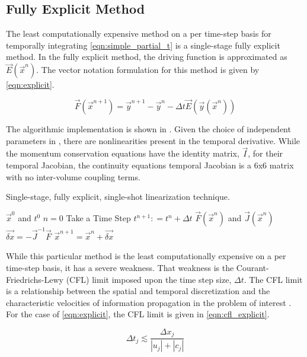 \subsection{Fully Explicit Method}
\label{subsect:numerics_explicit}
The least computationally expensive method on a per time-step basis for temporally integrating \eqref{eqn:simple_partial_t} is a single-stage fully explicit method.
In the fully explicit method, the driving function is approximated as $\vec{E}(\vec{x}^n)$.
The vector notation formulation for this method is given by \eqref{eqn:explicit}. 

\begin{equation}
\label{eqn:explicit}
\vec{F}(\vec{x}^{n+1}) = \vec{y}^{n+1} - \vec{y}^{n} - \Delta t \vec{E}(\vec{y}(\vec{x}^{n}))
\end{equation}

The algorithmic implementation is shown in .
Given the choice of independent parameters in \cobra{}, there are nonlinearities present in the temporal derivative.
While the momentum conservation equations have the identity matrix, $\vec{I}$, for their temporal Jacobian, the continuity equations temporal Jacobian is a 6x6 matrix with no inter-volume coupling terms.

\begin{algo}[H]
\caption{Single-stage, fully explicit, single-shot linearization technique.}
\label{algo:explicit}
\setlength{\baselineskip}{0.625\baselineskip}
\begin{algorithmic}[1]
\Require $\vec{x}^{0}$ and $t^{0}$
\Set $n = 0$
\Loop \; Take a Time Step
    \State $t^{n+1} : = t^{n} + \Delta t$
    \Calculate $\vec{F}(\vec{x}^n)$ and $\vec{J}(\vec{x}^n)$
    \Calculate $\vec{\delta x} = -\vec{J}^{-1}\vec{F}$
    \Calculate $\vec{x}^{n+1} = \vec{x}^{n} + \vec{\delta x}$ 
\end{algorithmic}
\end{algo}

While this particular method is the least computationally expensive on a per time-step basis, it has a severe weakness.
That weakness is the Courant-Friedrichs-Lewy (CFL) limit imposed upon the time step size, $\Delta t$.
The CFL limit is a relationship between the spatial and temporal discretization and the characteristic velocities of information propagation in the problem of interest \cite{LeVeque2007, Tannehill1997}.
For the case of \eqref{eqn:explicit}, the CFL limit is given in \eqref{eqn:cfl_explicit}.

\begin{equation}
\label{eqn:cfl_explicit}
\Delta t_j \lesssim \frac{\Delta x_j}{|u_j|+|c_j|}
\end{equation}

